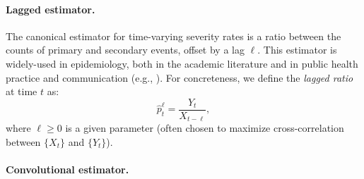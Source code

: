\documentclass{article}
\renewcommand{\hat}{\widehat} %
\begin{document}
\paragraph{Lagged estimator.} 

The canonical estimator for time-varying severity rates is a ratio between
the counts of primary and secondary events, offset by a lag $\ell$. This
estimator is widely-used in epidemiology, both in the academic literature and in
public health practice and communication (e.g., \citealp{wsj, atlantic,
  yuan2020monitoring, timevar_ifr, thomas2021estimating, horita2022global,
  LIU2023100350, germany}). For concreteness, we define the \emph{lagged ratio} 
at time $t$ as:   
\begin{equation}
\label{eq:lagged}
\hat{p}_t^\ell = \frac{Y_t}{X_{t-\ell}},
\end{equation}
where $\ell \geq 0$ is a given parameter (often chosen to maximize
cross-correlation between $\{X_t\}$ and $\{Y_t\}$).      

\paragraph{Convolutional estimator.} 
\end{document}

